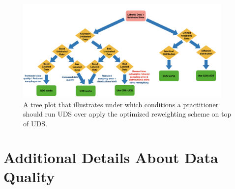 \begin{figure}[ht]
    \centering
    \includegraphics[width=0.95\textwidth]{chapters/uds/tree_plot.png}
    \vspace{-0.33cm}
    \caption{\footnotesize  A tree plot that illustrates under which conditions a practitioner should run UDS over apply the optimized reweighting scheme on top of UDS.}
    \vspace{-0.2cm}
    \label{fig:treeplot}
\end{figure}


\section{Additional Details About Data Quality}
\label{app:data_quality}

\begin{table}[t!]
\centering
{}
\caption{\footnotesize Success rate of the data shared from other tasks to the target task determined by the ground-truth multi-task reward function.}
\label{tbl:data_quality}
\normalsize
\end{table}

